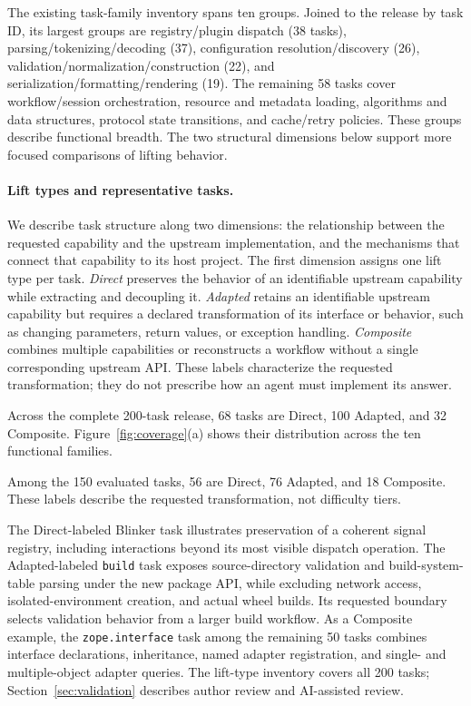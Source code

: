 \documentclass[acmsmall,screen,review,anonymous,nonacm]{acmart}
\begin{document}
The existing task-family inventory spans ten groups. Joined to the release by
task ID, its largest groups are registry/plugin dispatch (38 tasks),
parsing/tokenizing/decoding (37), configuration resolution/discovery (26),
validation/normalization/construction (22), and serialization/formatting/rendering
(19). The remaining 58 tasks cover workflow/session orchestration, resource and
metadata loading, algorithms and data structures, protocol state transitions,
and cache/retry policies. These groups describe functional breadth. The two structural dimensions below
support more focused comparisons of lifting behavior.

\paragraph{Lift types and representative tasks.}
\label{sec:lift-types}
We describe task structure along two dimensions: the relationship between the
requested capability and the upstream implementation, and the mechanisms that
connect that capability to its host project. The first dimension assigns one
lift type per task. \emph{Direct} preserves the behavior of an identifiable
upstream capability while extracting and decoupling it. \emph{Adapted} retains
an identifiable upstream capability but requires a declared transformation of
its interface or behavior, such as changing parameters, return values, or
exception handling. \emph{Composite} combines multiple capabilities or
reconstructs a workflow without a single corresponding upstream API. These
labels characterize the requested transformation; they do not prescribe how
an agent must implement its answer.

Across the complete 200-task release, 68 tasks are Direct, 100 Adapted,
and 32 Composite. Figure~\ref{fig:coverage}(a) shows their distribution
across the ten functional families.

Among the 150 evaluated tasks, 56 are Direct, 76 Adapted, and 18 Composite. These labels describe the requested transformation, not difficulty tiers.


The Direct-labeled Blinker task illustrates preservation of a coherent signal
registry, including interactions beyond its most visible dispatch operation.
The Adapted-labeled \texttt{build} task exposes source-directory validation and
build-system-table parsing under the new package API, while excluding network
access, isolated-environment creation, and actual wheel builds. Its requested
boundary selects validation behavior from a larger build workflow. As a
Composite example, the \texttt{zope.interface} task among the remaining 50 tasks combines
interface declarations, inheritance, named adapter registration, and single-
and multiple-object adapter queries. The lift-type inventory covers all 200 tasks;
Section~\ref{sec:validation} describes author review and AI-assisted review.
\end{document}
